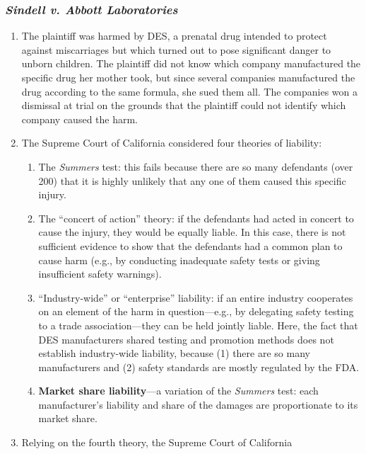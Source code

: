 \subsubsection{\emph{Sindell v. Abbott Laboratories}}

\begin{enumerate}
    \item The plaintiff was harmed by DES, a prenatal drug intended to protect 
    against miscarriages but which turned out to pose significant danger to 
    unborn children. The plaintiff did not know which company manufactured the 
    specific drug her mother took, but since several companies manufactured 
    the drug according to the same formula, she sued them all. The companies 
    won a dismissal at trial on the grounds that the plaintiff could not 
    identify which company caused the harm.
    \item The Supreme Court of California considered four theories of 
    liability:
    \begin{enumerate}
        \item The \emph{Summers} test: this fails because there are so many 
        defendants (over 200) that it is highly unlikely that any one of them 
        caused this specific injury.
        \item The ``concert of action'' theory: if the defendants had acted in 
        concert to cause the injury, they would be equally liable. In this 
        case, there is not sufficient evidence to show that the defendants had 
        a common plan to cause harm (e.g., by conducting inadequate safety 
        tests or giving insufficient safety warnings).
        \item ``Industry-wide'' or ``enterprise'' liability: if an entire 
        industry cooperates on an element of the harm in question---e.g., by 
        delegating safety testing to a trade association---they can be held 
        jointly liable. Here, the fact that DES manufacturers shared testing 
        and promotion methods does not establish industry-wide liability, 
        because (1) there are so many manufacturers and (2) safety standards 
        are mostly regulated by the FDA.
        \item \textbf{Market share liability}---a variation of the 
        \emph{Summers} test: each manufacturer's liability and share of the 
        damages are proportionate to its market share.
    \end{enumerate}
    \item Relying on the fourth theory, the Supreme Court of California 

\end{enumerate}
